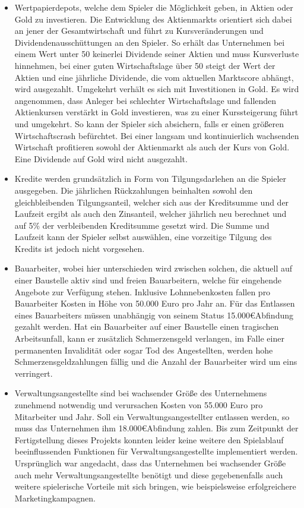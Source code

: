 \begin{itemize}
\item Wertpapierdepots, welche dem Spieler die Möglichkeit geben, in Aktien oder Gold zu investieren. Die Entwicklung des Aktienmarkts orientiert sich dabei an jener der Gesamtwirtschaft und führt zu Kursveränderungen und Dividendenausschüttungen an den Spieler. So erhält das Unternehmen bei einem Wert unter 50 keinerlei Dividende seiner Aktien und muss Kursverluste hinnehmen, bei einer guten Wirtschaftslage über 50 steigt der Wert der Aktien und eine jährliche Dividende, die vom aktuellen Marktscore abhängt, wird ausgezahlt. Umgekehrt verhält es sich mit Investitionen in Gold. Es wird angenommen, dass Anleger bei schlechter Wirtschaftslage und fallenden Aktienkursen verstärkt in Gold investieren, was zu einer Kurssteigerung führt und umgekehrt. So kann der Spieler sich absichern, falls er einen größeren Wirtschaftscrash befürchtet. Bei einer langsam und kontinuierlich wachsenden Wirtschaft profitieren sowohl der Aktienmarkt als auch der Kurs von Gold. Eine Dividende auf Gold wird nicht ausgezahlt.

\item Kredite werden grundsätzlich in Form von Tilgungsdarlehen an die Spieler ausgegeben. Die jährlichen Rückzahlungen beinhalten sowohl den gleichbleibenden Tilgungsanteil, welcher sich aus der Kreditsumme und der Laufzeit ergibt als auch den Zinsanteil, welcher jährlich neu berechnet und auf 5\% der verbleibenden Kreditsumme gesetzt wird. Die Summe und Laufzeit kann der Spieler selbst auswählen, eine vorzeitige Tilgung des Kredits ist jedoch nicht vorgesehen.

\item Bauarbeiter, wobei hier unterschieden wird zwischen solchen, die aktuell auf einer Baustelle aktiv sind und freien Bauarbeitern, welche für eingehende Angebote zur Verfügung stehen. Inklusive Lohnnebenkosten fallen pro Bauarbeiter Kosten in Höhe von 50.000 Euro pro Jahr an. Für das Entlassen eines Bauarbeiters müssen unabhängig von seinem Status 15.000\euro Abfindung gezahlt werden. Hat ein Bauarbeiter auf einer Baustelle einen tragischen Arbeitsunfall, kann er zusätzlich Schmerzensgeld verlangen, im Falle einer permanenten Invalidität oder sogar Tod des Angestellten, werden hohe Schmerzensgeldzahlungen fällig und die Anzahl der Bauarbeiter wird um eins verringert.

\item Verwaltungsangestellte sind bei wachsender Größe des Unternehmens zunehmend notwendig und verursachen Kosten von 55.000 Euro pro Mitarbeiter und Jahr. Soll ein Verwaltungsangestellter entlassen werden, so muss das Unternehmen ihm 18.000\euro Abfindung zahlen. Bis zum Zeitpunkt der Fertigstellung dieses Projekts konnten leider keine weitere den Spielablauf beeinflussenden Funktionen für Verwaltungsangestellte implementiert werden. Ursprünglich war angedacht, dass das Unternehmen bei wachsender Größe auch mehr Verwaltungsangestellte benötigt und diese gegebenenfalls auch weitere spielerische Vorteile mit sich bringen, wie beispielsweise erfolgreichere Marketingkampagnen.


\end{itemize}
